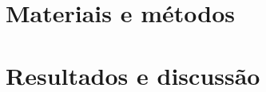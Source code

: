 \documentclass[
	12pt,				%
	openright,			%
	twoside,			%
	a4paper,			%
	english,			%
	brazil				%
	]{abntex2}
\begin{document}






\part{Materiais e métodos}



\part{Resultados e discussão}




\postextual



% 

%


%


\printindex
\end{document}
